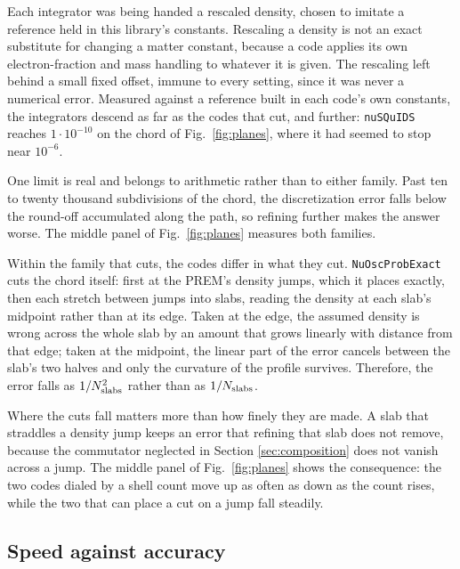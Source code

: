 \documentclass[final,5p,times,twocolumn,sort,compress]{elsarticle}
\newcommand{\fig}{Fig.}
\newcommand{\figu}[1]{\fig~\ref{fig:#1}}
\begin{document}
Each integrator was being handed a rescaled density, chosen to imitate a reference held in this library's constants.  Rescaling a density is not an exact substitute for changing a matter constant, because a code applies its own electron-fraction and mass handling to whatever it is given.  The rescaling left behind a small fixed offset, immune to every setting, since it was never a numerical error.  Measured against a reference built in each code's own constants, the integrators descend as far as the codes that cut, and further: {\tt nuSQuIDS} reaches $1 \cdot 10^{-10}$ on the chord of \figu{planes}, where it had seemed to stop near $10^{-6}$.

One limit is real and belongs to arithmetic rather than to either family.  Past ten to twenty thousand subdivisions of the chord, the discretization error falls below the round-off accumulated along the path, so refining further makes the answer worse.  The middle panel of \figu{planes} measures both families.

Within the family that cuts, the codes differ in what they cut.  {\tt NuOscProbExact} cuts the chord itself: first at the PREM's density jumps, which it places exactly, then each stretch between jumps into slabs, reading the density at each slab's midpoint rather than at its edge.  Taken at the edge, the assumed density is wrong across the whole slab by an amount that grows linearly with distance from that edge; taken at the midpoint, the linear part of the error cancels between the slab's two halves and only the curvature of the profile survives.  Therefore, the error falls as $1/N_{\rm slabs}^2$ rather than as $1/N_{\rm slabs}$.

Where the cuts fall matters more than how finely they are made.  A slab that straddles a density jump keeps an error that refining that slab does not remove, because the commutator neglected in Section \ref{sec:composition} does not vanish across a jump.  The middle panel of \figu{planes} shows the consequence: the two codes dialed by a shell count move up as often as down as the count rises, while the two that can place a cut on a jump fall steadily.


\subsection{Speed against accuracy}
\label{sec:plane}
\end{document}
